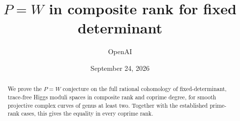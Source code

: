 \documentclass[11pt]{article}
\title{$P=W$ in composite rank for fixed determinant}
\author{OpenAI}
\date{September 24, 2026}
\begin{document}
\maketitle
\begin{abstract}
We prove the $P=W$ conjecture on the full rational cohomology of
fixed-determinant, trace-free Higgs moduli spaces in composite rank and
coprime degree, for smooth projective complex curves of genus at least two.
Together with the established prime-rank cases, this gives the equality in
every coprime rank.
\end{abstract}
\tableofcontents









{\small


}
\end{document}
